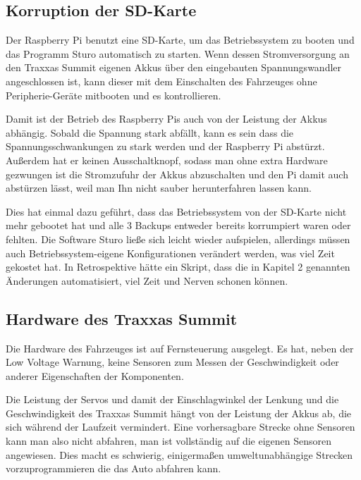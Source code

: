 \documentclass[a4paper,10pt]{scrartcl}
\begin{document}
  \subsection{Korruption der SD-Karte}

    Der Raspberry Pi benutzt eine SD-Karte, um das Betriebssystem zu booten und
    das Programm Sturo automatisch zu starten.
    Wenn dessen Stromversorgung an den Traxxas Summit eigenen Akkus über den
    eingebauten Spannungswandler angeschlossen ist, kann dieser mit dem
    Einschalten des Fahrzeuges ohne Peripherie-Geräte mitbooten und es
    kontrollieren.

    Damit ist der Betrieb des Raspberry Pis auch von der Leistung der Akkus
    abhängig.
    Sobald die Spannung stark abfällt, kann es sein dass die
    Spannungsschwankungen zu stark werden und der Raspberry Pi abstürzt.
    Außerdem hat er keinen Ausschaltknopf, sodass man ohne extra Hardware
    gezwungen ist die Stromzufuhr der Akkus abzuschalten und den Pi damit auch
    abstürzen lässt, weil man Ihn nicht sauber herunterfahren lassen kann.

    Dies hat einmal dazu geführt, dass das Betriebssystem von der SD-Karte nicht
    mehr gebootet hat und alle 3 Backups entweder bereits korrumpiert waren
    oder fehlten.
    Die Software Sturo ließe sich leicht wieder aufspielen, allerdings müssen
    auch Betriebssystem-eigene Konfigurationen verändert werden, was viel Zeit
    gekostet hat.
    In Retrospektive hätte ein Skript, dass die in Kapitel 2 genannten
    Änderungen automatisiert, viel Zeit und Nerven schonen können.

  \subsection{Hardware des Traxxas Summit}

    Die Hardware des Fahrzeuges ist auf Fernsteuerung ausgelegt.
    Es hat, neben der Low Voltage Warnung, keine Sensoren zum Messen der
    Geschwindigkeit oder anderer Eigenschaften der Komponenten.

    Die Leistung der Servos und damit der Einschlagwinkel der Lenkung und die
    Geschwindigkeit des Traxxas Summit hängt von der Leistung der Akkus ab,
    die sich während der Laufzeit vermindert.
    Eine vorhersagbare Strecke ohne Sensoren kann man also nicht abfahren, man
    ist vollständig auf die eigenen Sensoren angewiesen.
    Dies macht es schwierig, einigermaßen umweltunabhängige Strecken
    vorzuprogrammieren die das Auto abfahren kann.
\end{document}
